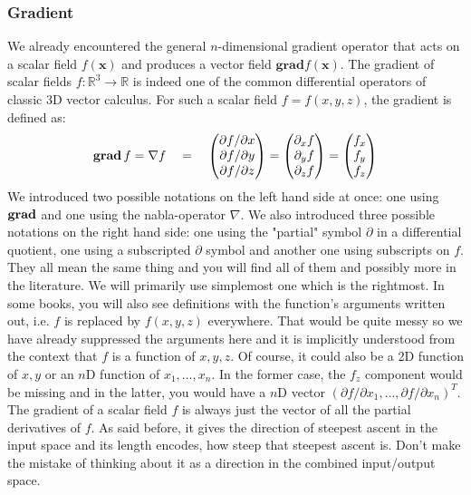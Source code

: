 \subsubsection{Gradient}
We already encountered the general $n$-dimensional gradient operator that acts on a scalar field $f(\mathbf{x})$ and produces a vector field $\mathbf{grad} f(\mathbf{x})$. The gradient of scalar fields $f: \mathbb{R}^3 \rightarrow \mathbb{R}$ is indeed one of the common differential operators of classic 3D vector calculus. For such a scalar field $f = f(x,y,z)$, the gradient is defined as:
\begin{equation}
 \operatorname{\mathbf{grad}} f = \nabla f  \quad = \quad
 \begin{pmatrix}
  \partial f / \partial x \\
  \partial f / \partial y \\
  \partial f / \partial z
 \end{pmatrix}
 =
 \begin{pmatrix}
  \partial_x f \\
  \partial_y f \\
  \partial_z f
\end{pmatrix}
= 
 \begin{pmatrix}
   f_x \\
   f_y \\
   f_z
\end{pmatrix} 
\end{equation}
We introduced two possible notations on the left hand side at once: one using $\operatorname{\mathbf{grad}}$ and one using the nabla-operator $\nabla$. We also introduced three possible notations on the right hand side: one using the "partial" symbol $\partial$ in a differential quotient, one using a subscripted $\partial$ symbol and another one using subscripts on $f$. They all mean the same thing and you will find all of them and possibly more in the literature. We will primarily use simplemost one which is the rightmost. In some books, you will also see definitions with the function's arguments written out, i.e. $f$ is replaced by $f(x,y,z)$ everywhere. That would be quite messy so we have already suppressed the arguments here and it is implicitly understood from the context that $f$ is a function of $x,y,z$. Of course, it could also be a 2D function of $x,y$ or an $n$D function of $x_1, \ldots, x_n$. In the former case, the $f_z$ component would be missing and in the latter, you would have a $n$D vector $(\partial f / \partial x_1, \ldots, \partial f / \partial x_n)^T$. The gradient of a scalar field $f$ is always just the vector of all the partial derivatives of $f$. As said before, it gives the direction of steepest ascent in the input space and its length encodes, how steep that steepest ascent is. Don't make the mistake of thinking about it as a direction in the combined input/output space.

